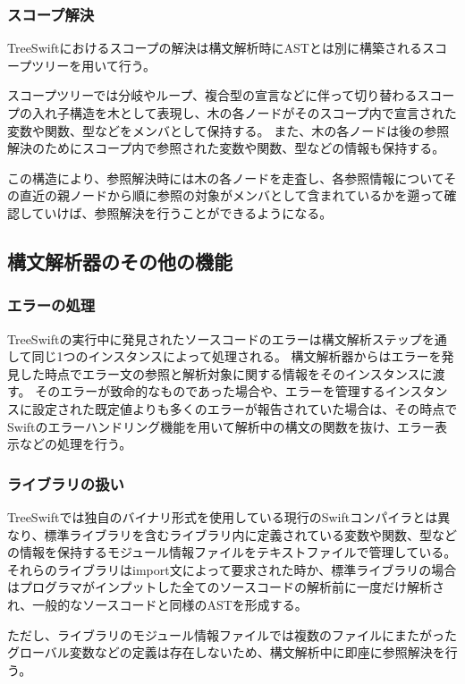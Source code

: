 \subsubsection{スコープ解決}

TreeSwiftにおけるスコープの解決は構文解析時にASTとは別に構築されるスコープツリーを用いて行う。

スコープツリーでは分岐やループ、複合型の宣言などに伴って切り替わるスコープの入れ子構造を木として表現し、木の各ノードがそのスコープ内で宣言された変数や関数、型などをメンバとして保持する。
また、木の各ノードは後の参照解決のためにスコープ内で参照された変数や関数、型などの情報も保持する。

この構造により、参照解決時には木の各ノードを走査し、各参照情報についてその直近の親ノードから順に参照の対象がメンバとして含まれているかを遡って確認していけば、参照解決を行うことができるようになる。


\subsection{構文解析器のその他の機能}

\subsubsection{エラーの処理}

TreeSwiftの実行中に発見されたソースコードのエラーは構文解析ステップを通して同じ1つのインスタンスによって処理される。
構文解析器からはエラーを発見した時点でエラー文の参照と解析対象に関する情報をそのインスタンスに渡す。
そのエラーが致命的なものであった場合や、エラーを管理するインスタンスに設定された既定値よりも多くのエラーが報告されていた場合は、その時点でSwiftのエラーハンドリング機能を用いて解析中の構文の関数を抜け、エラー表示などの処理を行う。


\subsubsection{ライブラリの扱い}

TreeSwiftでは独自のバイナリ形式を使用している現行のSwiftコンパイラとは異なり、標準ライブラリを含むライブラリ内に定義されている変数や関数、型などの情報を保持するモジュール情報ファイルをテキストファイルで管理している。
それらのライブラリはimport文によって要求された時か、標準ライブラリの場合はプログラマがインプットした全てのソースコードの解析前に一度だけ解析され、一般的なソースコードと同様のASTを形成する。

ただし、ライブラリのモジュール情報ファイルでは複数のファイルにまたがったグローバル変数などの定義は存在しないため、構文解析中に即座に参照解決を行う。



